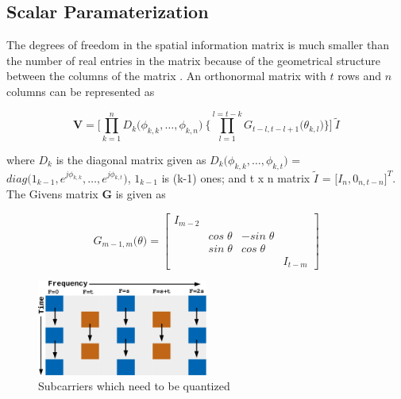 \documentclass[conference]{IEEEtran}
\begin{document}



\subsection{Scalar Paramaterization}
\label{givens}
The degrees of freedom in the spatial information matrix is much smaller than the number of real entries in the matrix because of the geometrical structure between the columns of the matrix \cite{4114278}. An orthonormal matrix with $t$ rows and $n$ columns can be represented as

\begin{equation}
\textbf{V} = \Bigg[\prod_{k=1}^{n} D_{k} \big( \phi_{k,k},\ldots , \phi_{k,n} \big) \: \Bigg\{ \prod_{l=1}^{l=t-k} G_{t-l,t-l+1} \big( \theta_{k,l}\big) \Bigg\} \Bigg] \: \tilde{I}
\end{equation}

where $D_{k}$ is the diagonal matrix given as $D_{k}\big(\phi_{k,k}, \ldots, \phi_{k,t} \big)$ =  $diag\big( 1_{k-1}, e^{j\phi_{k,k}},\ldots, e^{j\phi_{k,t}}  \big)$, $1_{k-1}$ is (k-1) ones; and t x n matrix $\tilde{I}$ = $\big[I_{n}, 0_{n,t-n}\big]^{T}$. The Givens matrix \textbf{G} is given as

\begin{equation}
G_{m-1,m}\big(\theta\big)  =
\begin{bmatrix}
I_{m-2} & & & \\
& cos\;\theta & - sin\;\theta & \\
& sin\;\theta & cos\;\theta & \\
& & & I_{t-m}
\end{bmatrix}
\end{equation}


\begin{figure}
\includegraphics[width=0.5\textwidth]{images/adpm.pdf}

\caption{Subcarriers which need to be quantized}
\label{ber_overvie}
\vspace{-5pt}
\end{figure}
\end{document}

